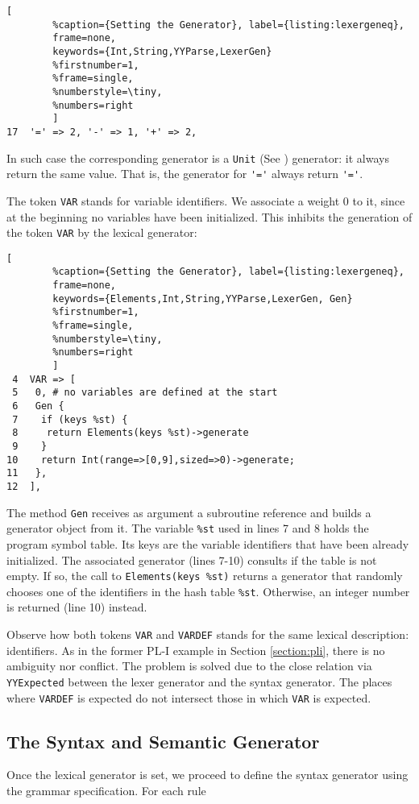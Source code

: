 \begin{lstlisting}[
        %caption={Setting the Generator}, label={listing:lexergeneq}, 
        frame=none,
        keywords={Int,String,YYParse,LexerGen}
        %firstnumber=1, 
        %frame=single,
        %numberstyle=\tiny,
        %numbers=right
        ]
17  '=' => 2, '-' => 1, '+' => 2, 
\end{lstlisting}
In such case the corresponding generator 
is a \verb|Unit| 
(See \cite{testlectrotest})
generator: it always return the same 
value. That is, the generator for \verb|'='| always return \verb|'='|.

The token \verb|VAR| stands for variable identifiers.
We associate a weight 0 to it,
since at the beginning no variables have been
initialized. This inhibits the generation of the token \verb|VAR| by
the lexical generator:
\begin{lstlisting}[
        %caption={Setting the Generator}, label={listing:lexergeneq}, 
        frame=none,
        keywords={Elements,Int,String,YYParse,LexerGen, Gen}
        %firstnumber=1, 
        %frame=single,
        %numberstyle=\tiny,
        %numbers=right
        ]
 4  VAR => [
 5   0, # no variables are defined at the start
 6   Gen {
 7    if (keys %st) {
 8     return Elements(keys %st)->generate 
 9    }
10    return Int(range=>[0,9],sized=>0)->generate;
11   },
12  ],
\end{lstlisting}

The method \verb|Gen| receives as argument a subroutine
reference and builds a generator object from it.
The variable \verb|%st| used in lines 7 and 8 holds the program symbol table.
Its keys are the variable identifiers that have been 
already initialized. The associated generator (lines 7-10) consults
if the table is not empty. If so,
the call to \verb|Elements(keys %st)| returns a
generator that randomly chooses one of the identifiers in the
hash table \verb|%st|. Otherwise,
an integer number is returned (line 10) instead.

Observe how both tokens \verb|VAR| and \verb|VARDEF| stands
for the same lexical description: identifiers.
As in the former PL-I example in Section \ref{section:pli},
there is no ambiguity nor conflict. The problem is solved 
due to the close relation via \verb|YYExpected| between the lexer generator
and the syntax generator.
The places where \verb|VARDEF| is expected do not intersect
those in which \verb|VAR| is expected.

\subsection{The Syntax and Semantic Generator}
Once the lexical generator is set,
we proceed to define the syntax generator
using the grammar specification.
For each rule

